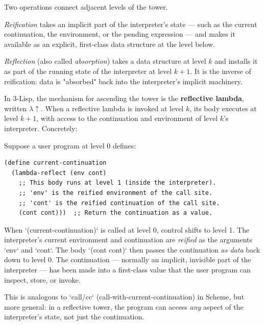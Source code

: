Two operations connect adjacent levels of the tower.

\begin{definition}[Reification]
\textit{Reification} takes an implicit part of the interpreter's state --- such as the current continuation, the environment, or the pending expression --- and makes it available as an explicit, first-class data structure at the level below.
\end{definition}

\begin{definition}[Reflection]
\textit{Reflection} (also called \textit{absorption}) takes a data structure at level $k$ and installs it as part of the running state of the interpreter at level $k + 1$. It is the inverse of reification: data is "absorbed" back into the interpreter's implicit machinery.

In 3-Lisp, the mechanism for ascending the tower is the \textbf{reflective lambda}, written $\lambda\!\uparrow$. When a reflective lambda is invoked at level $k$, its body executes at level $k + 1$, with access to the continuation and environment of level $k$'s interpreter. Concretely:
\end{definition}

\begin{example}
Suppose a user program at level 0 defines:

\begin{verbatim}
(define current-continuation
  (lambda-reflect (env cont)
    ;; This body runs at level 1 (inside the interpreter).
    ;; 'env' is the reified environment of the call site.
    ;; 'cont' is the reified continuation of the call site.
    (cont cont)))  ;; Return the continuation as a value.
\end{verbatim}

When `(current-continuation)` is called at level 0, control shifts to level 1. The interpreter's current environment and continuation are \textit{reified} as the arguments `env` and `cont`. The body `(cont cont)` then passes the continuation \textit{as data} back down to level 0. The continuation --- normally an implicit, invisible part of the interpreter --- has been made into a first-class value that the user program can inspect, store, or invoke.

This is analogous to `call/cc` (call-with-current-continuation) in Scheme, but more general: in a reflective tower, the program can access \textit{any} aspect of the interpreter's state, not just the continuation.
\end{example}

